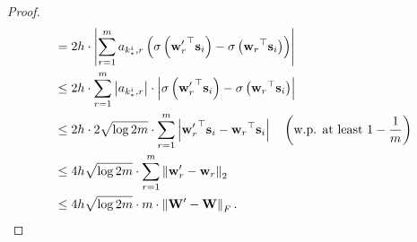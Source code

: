 \documentclass[10pt]{article}
\def\rvs{{\mathbf{s}}}
\def\rvw{{\mathbf{w}}}
\def\rmW{{\mathbf{W}}}
\begin{document}
\begin{proof}
\begin{equation*}
\begin{split}
    &= 2 h \cdot \left| \sum\limits_{r=1}^{m}{a_{k_*^i,r} \left( \sigma\left({\rvw_r^\prime}^\top \rvs_i\right) - \sigma\left({\rvw_r}^\top \rvs_i\right) \right) } \right| \\
    &\le 2 h \cdot \sum\limits_{r=1}^{m}{ \left| a_{k_*^i,r} \right| \cdot \left| \sigma\left({\rvw_r^\prime}^\top \rvs_i\right) - \sigma\left({\rvw_r}^\top \rvs_i\right) \right| } \\
    &\le 2 h \cdot 2 \sqrt{\log{2m}} \cdot \sum\limits_{r=1}^{m}{ \left| {\rvw_r^\prime}^\top \rvs_i - {\rvw_r}^\top \rvs_i \right| } \quad \left( \text{w.p. at least } 1 - \frac{1}{m} \right) \\
    &\le 4h \sqrt{\log{2m}} \cdot \sum\limits_{r=1}^{m}{ \left\| \rvw_r^\prime - \rvw_r \right\|_2 } \\
    &\le 4h \sqrt{\log{2m}} \cdot m \cdot \left\| \rmW^\prime - \rmW \right\|_F. \qedhere
\end{split}
\end{equation*}
\end{proof}
\end{document}
